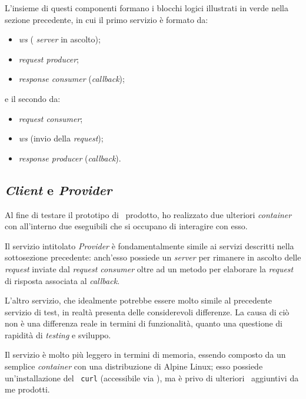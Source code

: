 \noindent
L'insieme di questi componenti formano i blocchi logici illustrati in verde nella sezione precedente, in cui il primo servizio è formato da:
\begin{itemize}
  \item {} \textit{\acrlong{ws}} ( \textit{server} in ascolto);
  \item \textit{request producer};
  \item \textit{response consumer} (\textit{callback});
\end{itemize}
\noindent
e il secondo da:
\begin{itemize}
  \item \textit{request consumer};
  \item {} \textit{\acrlong{ws}} (invio della \textit{request});
  \item \textit{response producer} (\textit{callback}).
\end{itemize}

\subsection{ \textit{Client} e  \textit{Provider} }

Al fine di testare il prototipo di \middleware\ prodotto, ho realizzato due ulteriori \textit{container} con all'interno due eseguibili che si occupano di interagire con esso.

Il servizio intitolato  \textit{Provider} è fondamentalmente simile ai servizi descritti nella sottosezione precedente: anch'esso possiede un  \textit{server} per rimanere in ascolto delle  \textit{request} inviate dal \textit{request consumer} oltre ad un metodo per elaborare la  \textit{request} di risposta associata al \textit{callback}.

L'altro servizio, che idealmente potrebbe essere molto simile al precedente servizio di test, in realtà presenta delle considerevoli differenze.
La causa di ciò non è una differenza reale in termini di funzionalità, quanto una questione di rapidità di \textit{testing} e sviluppo.

Il servizio è molto più leggero in termini di memoria, essendo composto da un semplice \textit{container} con una distribuzione di Alpine Linux; esso possiede un'installazione del \software\ \texttt{curl} (accessibile via ), ma è privo di ulteriori \software\ aggiuntivi da me prodotti.

